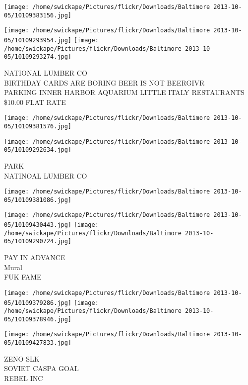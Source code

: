 \documentclass[10pt,letterpaper]{article}
\begin{document}
\texttt{[image: /home/swickape/Pictures/flickr/Downloads/Baltimore 2013-10-05/10109383156.jpg]}

\vspace{0.25in}
\texttt{[image: /home/swickape/Pictures/flickr/Downloads/Baltimore 2013-10-05/10109293954.jpg]}
\texttt{[image: /home/swickape/Pictures/flickr/Downloads/Baltimore 2013-10-05/10109293274.jpg]}

NATIONAL LUMBER CO\\
BIRTHDAY CARDS ARE BORING BEER IS NOT BEERGIVR\\
PARKING INNER HARBOR AQUARIUM LITTLE ITALY RESTAURANTS \$10.00 FLAT RATE\\
\pagebreak

\texttt{[image: /home/swickape/Pictures/flickr/Downloads/Baltimore 2013-10-05/10109381576.jpg]}

\vspace{0.25in}
\texttt{[image: /home/swickape/Pictures/flickr/Downloads/Baltimore 2013-10-05/10109292634.jpg]}

PARK\\
NATINOAL LUMBER CO\\
\pagebreak

\texttt{[image: /home/swickape/Pictures/flickr/Downloads/Baltimore 2013-10-05/10109381086.jpg]}

\vspace{0.25in}
\texttt{[image: /home/swickape/Pictures/flickr/Downloads/Baltimore 2013-10-05/10109430443.jpg]}
\texttt{[image: /home/swickape/Pictures/flickr/Downloads/Baltimore 2013-10-05/10109290724.jpg]}

PAY IN ADVANCE\\
Mural\\
FUK FAME\\
\pagebreak

\texttt{[image: /home/swickape/Pictures/flickr/Downloads/Baltimore 2013-10-05/10109379286.jpg]}
\texttt{[image: /home/swickape/Pictures/flickr/Downloads/Baltimore 2013-10-05/10109378946.jpg]}

\vspace{0.25in}
\texttt{[image: /home/swickape/Pictures/flickr/Downloads/Baltimore 2013-10-05/10109427833.jpg]}

ZENO SLK\\
SOVIET CASPA GOAL\\
REBEL INC\\
\pagebreak
\end{document}

